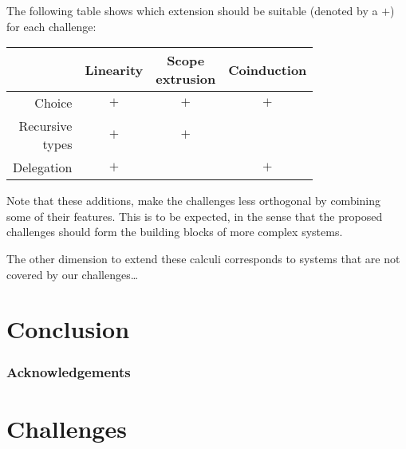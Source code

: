 \documentclass[runningheads]{llncs}
\begin{document}
The following table shows which extension should be suitable (denoted
by a $+$) for each challenge:

\vspace{.5em}

\begin{tabular}{|r|c|c|c|}
  \hline
  & Linearity & \shortstack{Scope \\ extrusion} & Coinduction \\
  \hline
  Choice & $+$ & $+$  & $+$ \\
  \hline
  \shortstack{Recursive \\ types} & $+$  & $+$ & \\
  \hline
  Delegation & $+$ & & $+$ \\
  \hline
\end{tabular}

\vspace{.5em}

Note that these additions, make the challenges less orthogonal by
combining some of their features. This is to be expected, in the sense
that the proposed challenges should form the building blocks of more
complex systems.

The other dimension to extend these calculi corresponds to systems
that are not covered by our challenges\dots






\section{Conclusion}\label{sec:conclusion}

\subsubsection*{Acknowledgements}

\appendix
\section{Challenges}\label{app:challenges}




\end{document}
